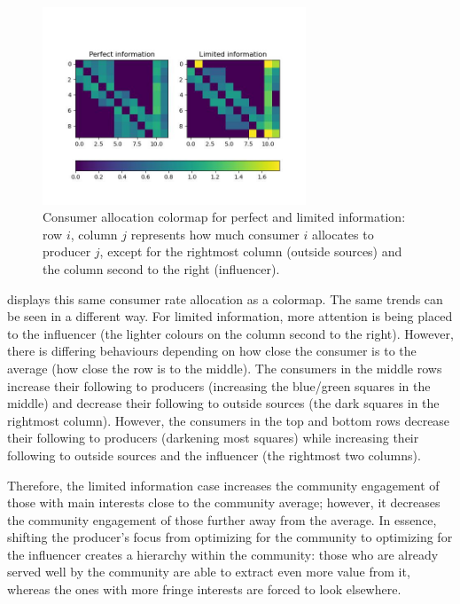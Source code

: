 \documentclass[11pt, letterpaper]{article}
\begin{document}
\begin{figure}[h]
    \centering
    \includegraphics[width=0.7\textwidth]{"figures/lim/colormap.jpg"}
\caption{Consumer allocation colormap for perfect and limited information: row \(i\), column \(j\) represents how much consumer \(i\) allocates to producer \(j\), except for the rightmost column (outside sources) and the column second to the right (influencer).}
\label{fig:lim_allocs_colormap}
\end{figure}

 displays this same consumer rate allocation as a colormap. The same trends can be seen in a different way. For limited information, more attention is being placed to the influencer (the lighter colours on the column second to the right). However, there is differing behaviours depending on how close the consumer is to the average (how close the row is to the middle). The consumers in the middle rows increase their following to producers (increasing the blue/green squares in the middle) and decrease their following to outside sources (the dark squares in the rightmost column). However, the consumers in the top and bottom rows decrease their following to producers (darkening most squares) while increasing their following to outside sources and the influencer (the rightmost two columns).

Therefore, the limited information case increases the community engagement of those with main interests close to the community average; however, it decreases the community engagement of those further away from the average. In essence, shifting the producer's focus from optimizing for the community to optimizing for the influencer creates a hierarchy within the community: those who are already served well by the community are able to extract even more value from it, whereas the ones with more fringe interests are forced to look elsewhere.
\end{document}

